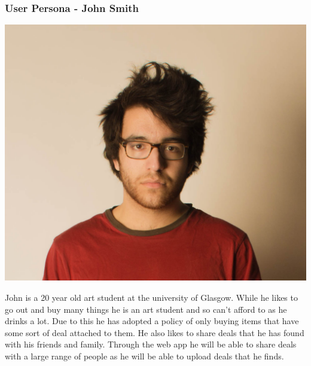 \documentclass{beamer}
\begin{document}
\begin{frame}
	\frametitle{User Persona - John Smith}
	\begin{center}
		\includegraphics[height=.3\textheight]{persona/john.png}
	\end{center}
	John is a 20 year old art student at the university of Glasgow. While he likes to go out and buy many things he is an art student and so can’t afford to as he drinks a lot. Due to this he has adopted a policy of only buying items that have some sort of deal attached to them. He also likes to share deals that he has found with his friends and family. Through the web app he will be able to share deals with a large range of people as he will be able to upload deals that he finds. 
\end{frame}
\end{document}
